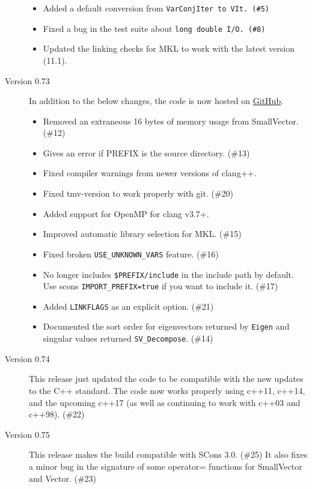 \begin{description}
\begin{itemize}
\item
Added a default conversion from \tt{VarConjIter} to \tt{VIt}. (\#5)

\item 
Fixed a bug in the test suite about \tt{long double} I/O. (\#8)

\item
Updated the linking checks for MKL to work with the latest version (11.1).

\end{itemize}

\item[Version 0.73]

In addition to the below changes, the code is now hosted on
\href{\websitex}{GitHub}.

\begin{itemize}

\item
Removed an extraneous 16 bytes of memory usage from SmallVector. (\#12)

\item
Gives an error if PREFIX is the source directory. (\#13)

\item
Fixed compiler warnings from newer versions of clang++.

\item
Fixed tmv-version to work properly with git. (\#20)

\item
Added support for OpenMP for clang v3.7+.

\item
Improved automatic library selection for MKL. (\#15)

\item
Fixed broken \texttt{USE\_UNKNOWN\_VARS} feature. (\#16)

\item
No longer includes \texttt{\$PREFIX/include} in the include path by default.
Use scons \texttt{IMPORT\_PREFIX=true} if you want to include it. (\#17)

\item
Added \texttt{LINKFLAGS} as an explicit option. (\#21)

\item
Documented the sort order for eigenvectors returned by \texttt{Eigen}
and singular values returned \texttt{SV\_Decompose}. (\#14)

\end{itemize}

\item[Version 0.74] 

This release just updated the code to be compatible with the new updates to the C++ standard.
The code now works properly using c++11, c++14, and the upcoming c++17 (as well as
continuing to work with c++03 and c++98). (\#22)

\item[Version 0.75] 

This release makes the build compatible with SCons 3.0. (\#25)
It also fixes a minor bug in the signature of some operator= functions for
SmallVector and Vector.  (\#23)

\end{description}
